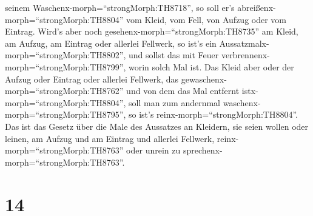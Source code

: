 seinem Waschenx-morph=``strongMorph:TH8718'', so soll er's
abreißenx-morph=``strongMorph:TH8804'' vom Kleid, vom Fell, von Aufzug
oder vom Eintrag.  Wird's aber noch
gesehenx-morph=``strongMorph:TH8735'' am Kleid, am Aufzug, am Eintrag
oder allerlei Fellwerk, so ist's ein
Aussatzmalx-morph=``strongMorph:TH8802'', und sollst das mit Feuer
verbrennenx-morph=``strongMorph:TH8799'', worin solch Mal ist.
 Das Kleid aber oder der Aufzug oder Eintrag oder allerlei
Fellwerk, das gewaschenx-morph=``strongMorph:TH8762'' und von dem das
Mal entfernt istx-morph=``strongMorph:TH8804'', soll man zum andernmal
waschenx-morph=``strongMorph:TH8795'', so ist's
reinx-morph=``strongMorph:TH8804''.  Das ist das Gesetz
über die Male des Aussatzes an Kleidern, sie seien wollen oder leinen,
am Aufzug und am Eintrag und allerlei Fellwerk,
reinx-morph=``strongMorph:TH8763'' oder unrein zu
sprechenx-morph=``strongMorph:TH8763''.

\hypertarget{section-13}{%
\section{14}\label{section-13}}

